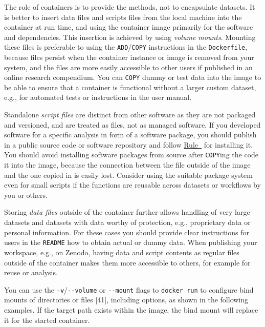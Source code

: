 \documentclass[10pt,letterpaper]{article}
\begin{document}
  \label{rule:mount} 

The role of containers is to provide the methods, not to encapsulate
datasets. It is better to insert data files and scripts files from the
local machine into the container at run time, and using the container
image primarily for the software and dependencies. This insertion is
achieved by using \emph{volume mounts}. Mounting these files is
preferable to using the \texttt{ADD}/\texttt{COPY} instructions in the
\texttt{Dockerfile}, because files persist when the container instance
or image is removed from your system, and the files are more easily
accessible to other users if published in an online research compendium.
You can \texttt{COPY} dummy or test data into the image to be able to
ensure that a container is functional without a larger custom dataset,
e.g., for automated tests or instructions in the user manual.

Standalone \emph{script files} are distinct from other software as they
are not packaged and versioned, and are treated as files, not as managed
software. If you developed software for a specific analysis in form of a
software package, you should publish in a public source code or software
repository and follow
\hyperref[{rule:pinning}]{Rule~} for installing
it. You should avoid installing software packages from source after
\texttt{COPY}ing the code it into the image, because the connection
between the file outside of the image and the one copied in is easily
lost. Consider using the suitable package system even for small scripts
if the functions are reusable across datasets or workflows by you or
others.

Storing \emph{data files} outside of the container further allows
handling of very large datasets and datasets with data worthy of
protection, e.g., proprietary data or personal information. For these
cases you should provide clear instructions for users in the
\texttt{README} how to obtain actual or dummy data. When publishing your
workspace, e.g., on Zenodo, having data and script contents as regular
files outside of the container makes them more accessible to others, for
example for reuse or analysis.

You can use the \texttt{-v}/\texttt{-\/-volume} or \texttt{-\/-mount}
flags to \texttt{docker\ run} to configure bind mounts of directories or
files {[}41{]}, including options, as shown in the following examples.
If the target path exists within the image, the bind mount will replace
it for the started container.
\end{document}
